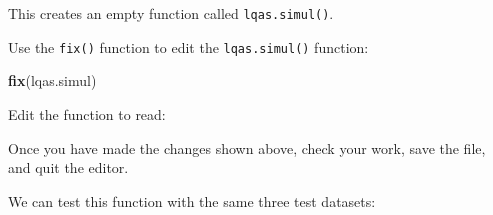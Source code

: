 \documentclass[12pt,a4paper]{book}
\newenvironment{Shaded}{\begin{snugshade}}{\end{snugshade}}
\newcommand{\KeywordTok}[1]{\textcolor[rgb]{0.13,0.29,0.53}{\textbf{#1}}}
\newcommand{\DataTypeTok}[1]{\textcolor[rgb]{0.13,0.29,0.53}{#1}}
\newcommand{\DecValTok}[1]{\textcolor[rgb]{0.00,0.00,0.81}{#1}}
\newcommand{\StringTok}[1]{\textcolor[rgb]{0.31,0.60,0.02}{#1}}
\newcommand{\ControlFlowTok}[1]{\textcolor[rgb]{0.13,0.29,0.53}{\textbf{#1}}}
\newcommand{\OperatorTok}[1]{\textcolor[rgb]{0.81,0.36,0.00}{\textbf{#1}}}
\newcommand{\NormalTok}[1]{#1}
\theoremstyle{definition}
\theoremstyle{definition}
\theoremstyle{definition}
\theoremstyle{remark}
\begin{document}
This creates an empty function called \texttt{lqas.simul()}.

Use the \texttt{fix()} function to edit the \texttt{lqas.simul()}
function:

\begin{Shaded}
\begin{Highlighting}[]
\KeywordTok{fix}\NormalTok{(lqas.simul)}
\end{Highlighting}
\end{Shaded}

Edit the function to read:

\begin{Shaded}
\end{Shaded}

Once you have made the changes shown above, check your work, save the
file, and quit the editor.

We can test this function with the same three test datasets:
\end{document}
